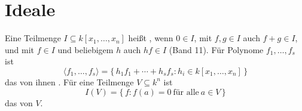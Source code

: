 \section{Ideale}

\begin{definition}
Eine Teilmenge $I\subseteq k[x_1, \ldots, x_n]$ heißt , wenn $0\in I$, mit $f, g\in I$ auch $f + g\in I$, und mit $f\in I$ und beliebigem $h$ auch $hf\in I$ (Band 11). Für Polynome $f_1, \ldots, f_s$ ist
\[ \langle f_1, \ldots, f_s\rangle = \{\,h_1f_1 + \cdots + h_sf_s : h_i\in k[x_1, \ldots, x_n]\,\} \]
das von ihnen . Für eine Teilmenge $V\subseteq k^{n}$ ist
\[ I(V) = \{\,f : f(a) = 0\ \text{für alle}\ a\in V\,\} \]
das  von $V$.
\end{definition}

